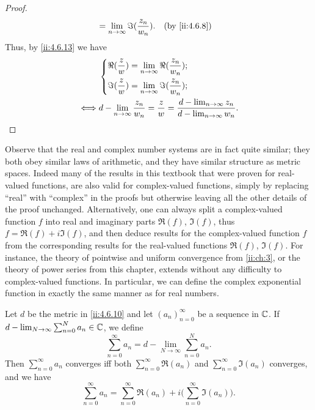 \begin{proof}
\begin{align*}
                      & = \lim_{n \to \infty} \Im(\dfrac{z_n}{w_n}).                                                                       &  & \by{ii:4.6.8}
  \end{align*}
  Thus, by \cref{ii:4.6.13} we have
  \begin{align*}
         & \begin{dcases}
             \Re(\dfrac{z}{w}) = \lim_{n \to \infty} \Re(\dfrac{z_n}{w_n}); \\
             \Im(\dfrac{z}{w}) = \lim_{n \to \infty} \Im(\dfrac{z_n}{w_n});
           \end{dcases}                                                              \\
    \iff & d - \lim_{n \to \infty} \dfrac{z_n}{w_n} = \dfrac{z}{w} = \dfrac{d - \lim_{n \to \infty} z_n}{d - \lim_{n \to \infty} w_n}.
  \end{align*}
\end{proof}

\begin{note}
  Observe that the real and complex number systems are in fact quite similar;
  they both obey similar laws of arithmetic, and they have similar structure as metric spaces.
  Indeed many of the results in this textbook that were proven for real-valued functions, are also valid for complex-valued functions, simply by replacing ``real'' with ``complex'' in the proofs but otherwise leaving all the other details of the proof unchanged.
  Alternatively, one can always split a complex-valued function \(f\) into real and imaginary parts \(\Re(f)\), \(\Im(f)\), thus \(f = \Re(f) + i \Im(f)\), and then deduce results for the complex-valued function \(f\) from the corresponding results for the real-valued functions \(\Re(f)\), \(\Im(f)\).
  For instance, the theory of pointwise and uniform convergence from \cref{ii:ch:3}, or the theory of power series from this chapter, extends without any difficulty to complex-valued functions.
  In particular, we can define the complex exponential function in exactly the same manner as for real numbers.
\end{note}

\begin{ac}\label{ii:ac:4.6.6}
  Let \(d\) be the metric in \cref{ii:4.6.10} and let \((a_n)_{n = 0}^\infty\) be a sequence in \(\mathbb{C}\).
  If \(d - \lim_{N \to \infty} \sum_{n = 0}^N a_n \in \mathbb{C}\), we define
  \[
    \sum_{n = 0}^\infty a_n = d - \lim_{N \to \infty} \sum_{n = 0}^N a_n.
  \]
  Then \(\sum_{n = 0}^\infty a_n\) converges iff both \(\sum_{n = 0}^\infty \Re(a_n)\) and \(\sum_{n = 0}^\infty \Im(a_n)\) converges, and we have
  \[
    \sum_{n = 0}^\infty a_n = \sum_{n = 0}^\infty \Re(a_n) + i \bigg(\sum_{n = 0}^\infty \Im(a_n)\bigg).
  \]
\end{ac}

